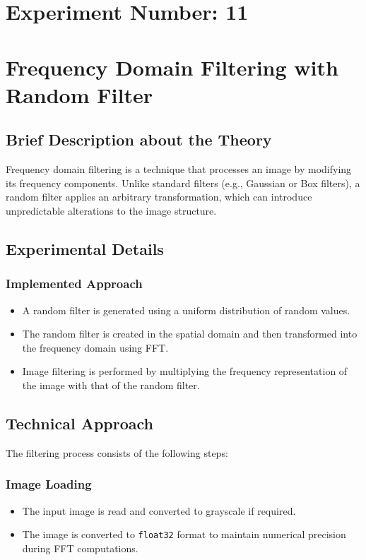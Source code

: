 \documentclass[12pt,a4paper]{article}
\begin{document}
\newpage
\section*{Experiment Number: 11}
\section{Frequency Domain Filtering with Random Filter}

\subsection{Brief Description about the Theory}
Frequency domain filtering is a technique that processes an image by modifying its frequency components. Unlike standard filters (e.g., Gaussian or Box filters), a random filter applies an arbitrary transformation, which can introduce unpredictable alterations to the image structure.

\subsection{Experimental Details}
\subsubsection{Implemented Approach}
\begin{itemize}
  \item A random filter is generated using a uniform distribution of random values.
  \item The random filter is created in the spatial domain and then transformed into the frequency domain using FFT.
  \item Image filtering is performed by multiplying the frequency representation of the image with that of the random filter.
\end{itemize}

\subsection{Technical Approach}
The filtering process consists of the following steps:

\subsubsection{Image Loading}
\begin{itemize}
  \item The input image is read and converted to grayscale if required.
  \item The image is converted to \texttt{float32} format to maintain numerical precision during FFT computations.
\end{itemize}
\end{document}
